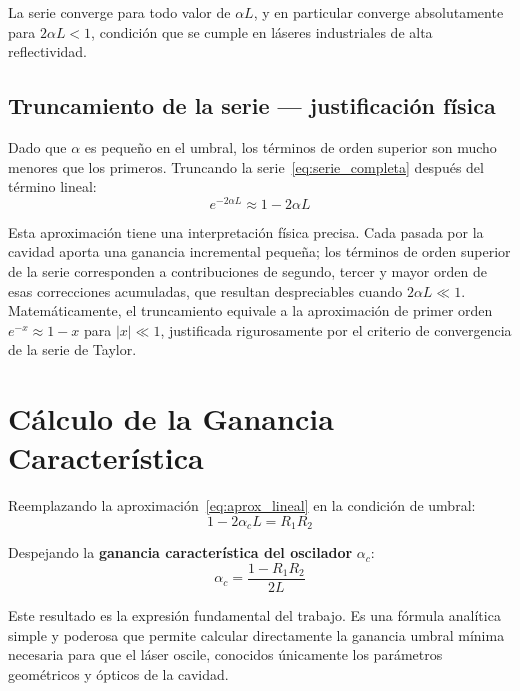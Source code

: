 \documentclass[12pt, a4paper]{article}
\begin{document}
La serie converge para todo valor de $\alpha L$, y en particular converge
absolutamente para $2\alpha L < 1$, condición que se cumple en láseres
industriales de alta reflectividad.

\subsection{Truncamiento de la serie — justificación física}

Dado que $\alpha$ es pequeño en el umbral, los términos de orden superior son mucho menores
que los primeros. Truncando la serie~\eqref{eq:serie_completa} después del término lineal:
%
\begin{equation}
  \boxed{e^{-2\alpha L} \approx 1 - 2\alpha L}
  \label{eq:aprox_lineal}
\end{equation}

Esta aproximación tiene una interpretación física precisa. Cada pasada por la cavidad
aporta una ganancia incremental pequeña; los términos de orden superior de la serie
corresponden a contribuciones de segundo, tercer y mayor orden de esas correcciones
acumuladas, que resultan despreciables cuando $2\alpha L \ll 1$.
Matemáticamente, el truncamiento equivale a la aproximación de primer orden
$e^{-x} \approx 1 - x$ para $|x| \ll 1$, justificada rigurosamente por el criterio
de convergencia de la serie de Taylor.

\section{Cálculo de la Ganancia Característica}

Reemplazando la aproximación~\eqref{eq:aprox_lineal} en la condición de umbral:
%
\begin{equation}
  1 - 2\alpha_c L = R_1 R_2
\end{equation}

Despejando la \textbf{ganancia característica del oscilador} $\alpha_c$:
%
\begin{equation}
  \boxed{\alpha_c = \frac{1 - R_1 R_2}{2L}}
  \label{eq:ganancia}
\end{equation}

Este resultado es la expresión fundamental del trabajo. Es una fórmula analítica simple y
poderosa que permite calcular directamente la ganancia umbral mínima necesaria para que el
láser oscile, conocidos únicamente los parámetros geométricos y ópticos de la cavidad.
\end{document}
